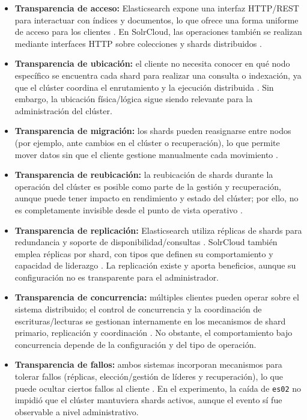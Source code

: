 \documentclass[12pt,a4paper]{article}
\begin{document}
\begin{itemize}
    \item \textbf{Transparencia de acceso:} Elasticsearch expone una interfaz HTTP/REST para interactuar con índices y documentos, lo que ofrece una forma uniforme de acceso para los clientes \cite{elastic_distributed_architecture,elastic_read_write}. En SolrCloud, las operaciones también se realizan mediante interfaces HTTP sobre colecciones y shards distribuidos \cite{solr_distributed_requests,solr_shards_indexing}.
    \item \textbf{Transparencia de ubicación:} el cliente no necesita conocer en qué nodo específico se encuentra cada shard para realizar una consulta o indexación, ya que el clúster coordina el enrutamiento y la ejecución distribuida \cite{elastic_read_write,solr_distributed_requests}. Sin embargo, la ubicación física/lógica sigue siendo relevante para la administración del clúster.
    \item \textbf{Transparencia de migración:} los shards pueden reasignarse entre nodos (por ejemplo, ante cambios en el clúster o recuperación), lo que permite mover datos sin que el cliente gestione manualmente cada movimiento \cite{elastic_nodes_shards,elastic_resilience,solr_recoveries}.
    \item \textbf{Transparencia de reubicación:} la reubicación de shards durante la operación del clúster es posible como parte de la gestión y recuperación, aunque puede tener impacto en rendimiento y estado del clúster; por ello, no es completamente invisible desde el punto de vista operativo \cite{elastic_resilience,solr_recoveries}.
    \item \textbf{Transparencia de replicación:} Elasticsearch utiliza réplicas de shards para redundancia y soporte de disponibilidad/consultas \cite{elastic_nodes_shards,elastic_read_write}. SolrCloud también emplea réplicas por shard, con tipos que definen su comportamiento y capacidad de liderazgo \cite{solr_shards_indexing}. La replicación existe y aporta beneficios, aunque su configuración no es transparente para el administrador.
    \item \textbf{Transparencia de concurrencia:} múltiples clientes pueden operar sobre el sistema distribuido; el control de concurrencia y la coordinación de escrituras/lecturas se gestionan internamente en los mecanismos de shard primario, replicación y coordinación \cite{elastic_read_write,solr_shards_indexing}. No obstante, el comportamiento bajo concurrencia depende de la configuración y del tipo de operación.
    \item \textbf{Transparencia de fallos:} ambos sistemas incorporan mecanismos para tolerar fallos (réplicas, elección/gestión de líderes y recuperación), lo que puede ocultar ciertos fallos al cliente \cite{elastic_resilience,solr_distributed_requests,solr_recoveries}. En el experimento, la caída de \texttt{es02} no impidió que el clúster mantuviera shards activos, aunque el evento sí fue observable a nivel administrativo.
\end{itemize}
\end{document}
